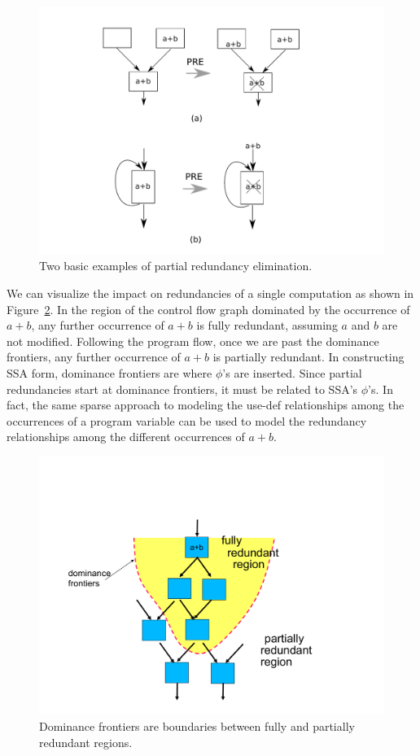 \begin{figure}
\centering
\includegraphics[scale=0.45]{fig-pre-examples.pdf}
\caption{Two basic examples of partial redundancy elimination.}
\label{fig: pre-examples}
\end{figure}

We can visualize the impact on redundancies of a single computation
as shown in Figure~\ref{fig: ssapre-motive}.  
In the region of the control flow graph dominated by the occurrence of $a+b$, 
any further occurrence of $a+b$ is fully redundant, assuming $a$ and $b$ are
not modified.  Following the program flow,
once we are past the dominance frontiers, any further occurrence of $a+b$ is
partially redundant.  In constructing SSA form, dominance frontiers are where
$\phi$'s are inserted.   Since partial redundancies start at dominance
frontiers, it must be related to SSA's $\phi$'s.  In fact, the same sparse
approach to modeling the use-def relationships among the occurrences of
a program variable can be used to model the redundancy relationships among 
the different occurrences of $a+b$.

\begin{figure}
\centering
\includegraphics[scale=0.35]{fig-ssapre-motive.pdf}
\caption{Dominance frontiers are boundaries between fully and partially redundant regions.}
\label{fig: ssapre-motive}
\end{figure}

